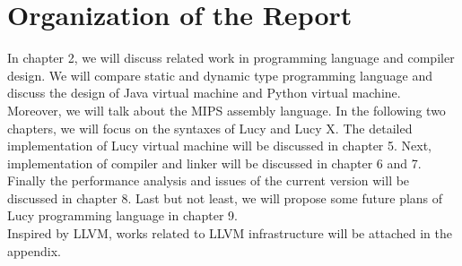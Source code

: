 \section{Organization of the Report}
In chapter 2, we will discuss related work in programming language and compiler design. We will compare static and dynamic type programming language and discuss the design of Java virtual machine and Python virtual machine. Moreover, we will talk about the MIPS assembly language. In the following two chapters, we will focus on the syntaxes of Lucy and Lucy X. The detailed implementation of Lucy virtual machine will be discussed in chapter 5. Next, implementation of compiler and linker will be discussed in chapter 6 and 7. Finally the performance analysis and issues of the current version will be discussed in chapter 8. Last but not least, we will propose some future plans of Lucy programming language in chapter 9. \\
Inspired by LLVM, works related to LLVM infrastructure will be attached in the appendix.
